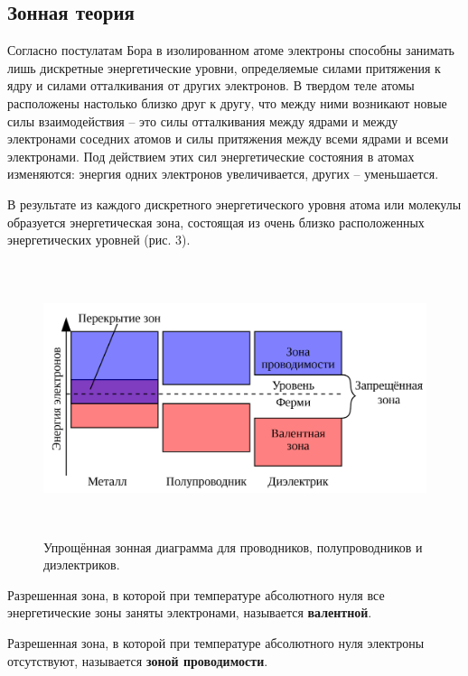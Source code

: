 	\clearpage

	\subsection{Зонная теория}
	
	\par Согласно постулатам Бора в изолированном атоме электроны способны занимать лишь дискретные энергетические уровни, определяемые силами притяжения к ядру и силами отталкивания от других электронов. В твердом теле атомы расположены настолько близко друг к другу, что между ними возникают новые силы взаимодействия – это силы отталкивания между ядрами и между электронами соседних атомов и силы притяжения между всеми ядрами и всеми электронами. Под действием этих сил энергетические состояния в атомах изменяются: энергия одних электронов увеличивается, других – уменьшается. 
	\par В результате из каждого дискретного энергетического уровня атома или молекулы образуется энергетическая зона, состоящая из очень близко расположенных энергетических уровней (рис. 3). 

	\begin{figure}[h]
		\centering
		\includegraphics[height=8cm]{img/4} 
		\captionsetup{font=footnotesize}
		\caption{Упрощённая зонная диаграмма для проводников, полупроводников и диэлектриков.} 
	\end{figure}
	
	\par Разрешенная зона, в которой при температуре абсолютного нуля все энергетические зоны заняты электронами, называется \textbf{валентной}.
	
	\par Разрешенная зона, в которой при температуре абсолютного нуля электроны отсутствуют, называется \textbf{зоной проводимости}.
	
